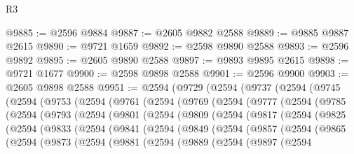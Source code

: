 \begin{lexlean}{R3}
\begin{coremodule}
@9885 := @2596 @9884
@9887 := @2605 @9882 @2588
@9889 := @9885 @9887 @2615
@9890 := @9721 @1659
@9892 := @2598 @9890 @2588
@9893 := @2596 @9892
@9895 := @2605 @9890 @2588
@9897 := @9893 @9895 @2615
@9898 := @9721 @1677
@9900 := @2598 @9898 @2588
@9901 := @2596 @9900
@9903 := @2605 @9898 @2588
@9951 := @2594
    (@9729
      (@2594
        (@9737
          (@2594
            (@9745
              (@2594
                (@9753
                  (@2594
                    (@9761
                      (@2594
                        (@9769
                          (@2594
                            (@9777
                              (@2594
                                (@9785
                                  (@2594
                                    (@9793
                                      (@2594
                                        (@9801
                                          (@2594
                                            (@9809
                                              (@2594
                                                (@9817
                                                  (@2594
                                                    (@9825
                                                      (@2594
                                                        (@9833
                                                          (@2594
                                                            (@9841
                                                              (@2594
                                                                (@9849
                                                                  (@2594
                                                                    (@9857
                                                                      (@2594
                                                                        (@9865
                                                                          (@2594
                                                                            (@9873
                                                                              (@2594
                                                                                (@9881
                                                                                  (@2594
                                                                                    (@9889
                                                                                      (@2594
                                                                                        (@9897
                                                                                          (@2594

\end{coremodule}
\end{lexlean}
